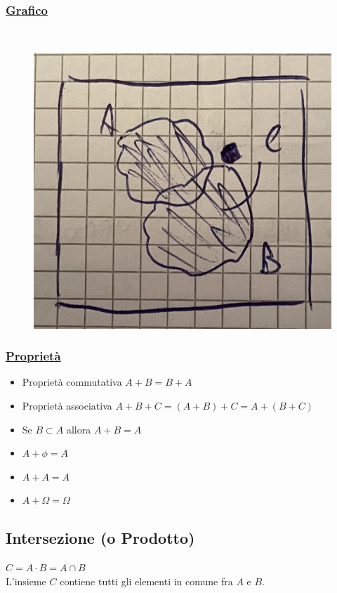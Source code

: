 \documentclass{article}
\begin{document}
\subsubsection{\underline{Grafico}} ~\\
\begin{figure}[ht]
\centering
\includegraphics[scale=0.13]{images/16.VennSomma.jpeg}
\end{figure} 
\subsubsection{\underline{Proprietà}}
\begin{itemize}
    \item Proprietà commutativa $A + B = B + A$
    \item Proprietà associativa $A + B + C = (A + B) + C = A + (B + C)$
    \item Se $B \subset A$ allora $A + B = A$
    \item $A + \phi = A$
    \item $A + A = A$
    \item $A + \Omega = \Omega$
\end{itemize}

\subsection{Intersezione (o Prodotto)}
$C = A \cdot B = A \cap B$ \\
L’insieme $C$ contiene tutti gli elementi in comune fra $A$ e $B$.
\end{document}
